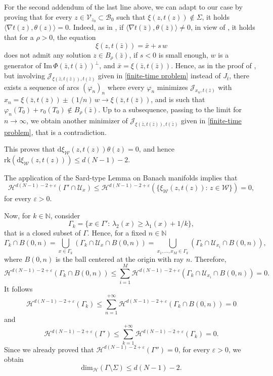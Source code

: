 \documentclass[a4paper,10pt]{amsart}
\newcommand{\numberset}{\mathbb}
\newcommand{\N}{\numberset{N}}
\newcommand{\ud}{\mathrm{d}}
\theoremstyle{plain}
\theoremstyle{definition}
\numberwithin{equation}{section}
\numberwithin{thm}{section}
\begin{document}
For the second addendum of the last line above, we can adapt \cite[Proposition 6.6.8]{MR2041617} to our case by proving that for every $z\in \mathcal V_{z_0}\subset \mathcal B_0$ such that $\xi(z,t(z))\notin \Sigma$, it holds $\langle \nabla t(z), \theta(z)\rangle =0$. Indeed, as in \cite{MR2041617}, if $\langle \nabla t(\bar z), \theta(\bar z)\rangle \neq 0$, in view of \cite[Lemmas 6.6.6 and 6.6.11]{MR2041617}, it holds that for a $\rho>0$, the equation
\[
\xi(z,t(\bar z)) = \bar x  + s\,w
\]
does not admit any solution $z \in B_\rho(\bar z)$, if $s<0$ is small enough, $w$ is a generator of $\mathrm{Im}\,\Phi(\bar z, t(\bar z))^\perp$, and $\bar x = \xi(\bar z, t(\bar z))$. Hence, as in the proof of \cite[Proposition 6.6.8]{MR2041617}, but involving $\mathcal J_{\xi(\bar z,t(\bar z)),t(\bar z)}$ given in \eqref{finite-time problem} instead of $J_{\bar t}$, there exists a sequence of arcs $(\varphi_n)_n$ where every $\varphi_n$ minimizes $\mathcal J_{x_n,t(\bar z)}$ with $x_n=\xi(\bar z, t(\bar z))\pm (1/n)\,w \to \xi(\bar z,t(\bar z))$, and is such that $\varphi_n(T_0)+r_0(T_0) \notin B_\rho(\bar z)$. Up to a subsequence, passing to the limit for $n\to \infty$, we obtain another minimizer of $\mathcal J_{\xi(\bar z,t(\bar z)),t(\bar z)}$ given in \eqref{finite-time problem}, that is a contradiction.

This proves that $\ud \xi_{\mathcal W}(z,t(z)) \theta(z) = 0$, and hence $\mathrm{rk}(\ud\xi_{\mathcal W}(z,t(z))) \le d(N-1)-2$.

The application of the Sard-type Lemma on Banach manifolds  \cite{Sard} implies that
\[
\mathcal H^{
d(N-1)-2+\varepsilon}(\Gamma '\cap \mathcal U_x)\le \mathcal H^{d(N-1)-2+\varepsilon}(\{\xi_{\mathcal W}(z,t(z)):\,z \in \mathcal W\})=0,
\]
for every $\varepsilon >0$. 

Now, for $k\in \mathbb N$, consider
\[
\Gamma_k = \{x \in \Gamma': \, \lambda_2(x)\ge \lambda_1(x)+1/k\},
\]
that is a closed subset of $\Gamma$. Hence, for a fixed $n\in\N$
\[
\Gamma_k \cap B(0,n) = \bigcup_{x \in \Gamma_k} (\Gamma_k \cap \mathcal{U}_x\cap B(0,n)) = \bigcup_{x_1,\dots,x_M\in \Gamma_k} (\Gamma_k \cap \mathcal{U}_{x_i} \cap B(0,n)),
\]
where $B(0,n)$ is the ball centered at the origin with ray $n$. Therefore,
\[
\mathcal H^{d(N-1)-2+\varepsilon}(\Gamma_k\cap B(0,n)) \le \sum_{i=1}^{M}\mathcal H^{d(N-1)-2+\varepsilon}(\Gamma_k \cap \mathcal U_{x_i}\cap B(0,n))=0.
\]
It follows
\[
\mathcal H^{d(N-1)-2+\varepsilon}(\Gamma_k)\le \sum_{n=1}^{+\infty}\mathcal H^{d(N-1)-2+\varepsilon}(\Gamma_k \cap B(0,n)) =0
\]
and
\[
\mathcal{H}^{d(N-1)-2+\varepsilon}(\Gamma') \le \sum_{k=1}^{+\infty}\mathcal{H}^{d(N-1)-2+\varepsilon}(\Gamma_k)=0.
\]
Since
we already proved that $\mathcal H^{
d(N-1)-2+\varepsilon}(\Gamma '')=0$, for every $\varepsilon > 0$, we obtain
\[
\mathrm{dim}_{\mathcal H}(\Gamma \setminus \Sigma) \le d(N-1)-2.
\]
\end{document}
